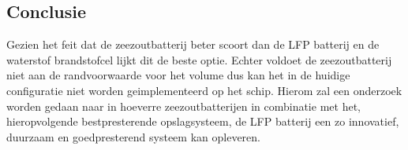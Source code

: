 \begin{table}[h]
\centering
\caption{Scoretabel van energieopslagmethoden specifiek voor Jansje}
\label{tab:allesheetdit}
\end{table}

\subsection*{Conclusie}

\noindent Gezien het feit dat de zeezoutbatterij beter scoort dan de LFP batterij en de waterstof brandstofcel lijkt dit de beste optie. Echter voldoet de zeezoutbatterij niet aan de randvoorwaarde voor het volume dus kan het in de huidige configuratie niet worden geimplementeerd op het schip. Hierom zal een onderzoek worden gedaan naar in hoeverre zeezoutbatterijen in combinatie met het, hieropvolgende bestpresterende opslagsysteem, de LFP batterij een zo innovatief, duurzaam en goedpresterend systeem kan opleveren. 

